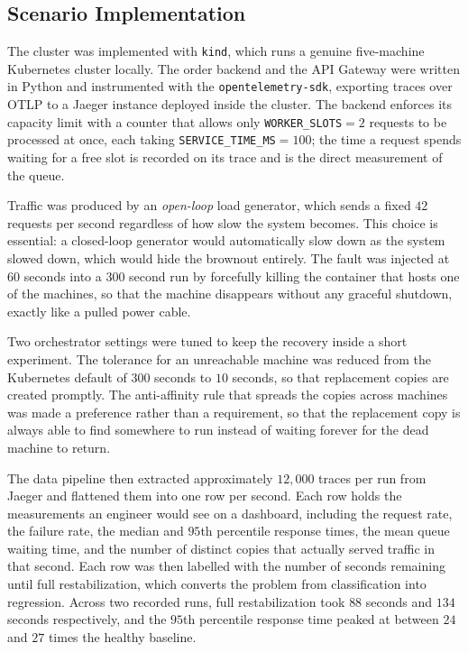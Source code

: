 \subsection{Scenario Implementation}
The cluster was implemented with \texttt{kind}, which runs a genuine
five-machine Kubernetes cluster locally. The order backend and the API Gateway
were written in Python and instrumented with the \texttt{opentelemetry-sdk},
exporting traces over OTLP to a Jaeger instance deployed inside the cluster. The
backend enforces its capacity limit with a counter that allows only
\texttt{WORKER\_SLOTS}$=2$ requests to be processed at once, each taking
\texttt{SERVICE\_TIME\_MS}$=100$; the time a request spends waiting for a free
slot is recorded on its trace and is the direct measurement of the queue.

Traffic was produced by an \textit{open-loop} load generator, which sends a
fixed $42$ requests per second regardless of how slow the system becomes. This
choice is essential: a closed-loop generator would automatically slow down as
the system slowed down, which would hide the brownout entirely. The fault was
injected at $60$ seconds into a $300$ second run by forcefully killing the
container that hosts one of the machines, so that the machine disappears without
any graceful shutdown, exactly like a pulled power cable.

Two orchestrator settings were tuned to keep the recovery inside a short
experiment. The tolerance for an unreachable machine was reduced from the
Kubernetes default of $300$ seconds to $10$ seconds, so that replacement copies
are created promptly. The anti-affinity rule that spreads the copies across
machines was made a preference rather than a requirement, so that the
replacement copy is always able to find somewhere to run instead of waiting
forever for the dead machine to return.

The data pipeline then extracted approximately $12{,}000$ traces per run from
Jaeger and flattened them into one row per second. Each row holds the
measurements an engineer would see on a dashboard, including the request rate,
the failure rate, the median and $95$th percentile response times, the mean
queue waiting time, and the number of distinct copies that actually served
traffic in that second. Each row was then labelled with the number of seconds
remaining until full restabilization, which converts the problem from
classification into regression. Across two recorded runs, full restabilization
took $88$ seconds and $134$ seconds respectively, and the $95$th percentile
response time peaked at between $24$ and $27$ times the healthy baseline.

